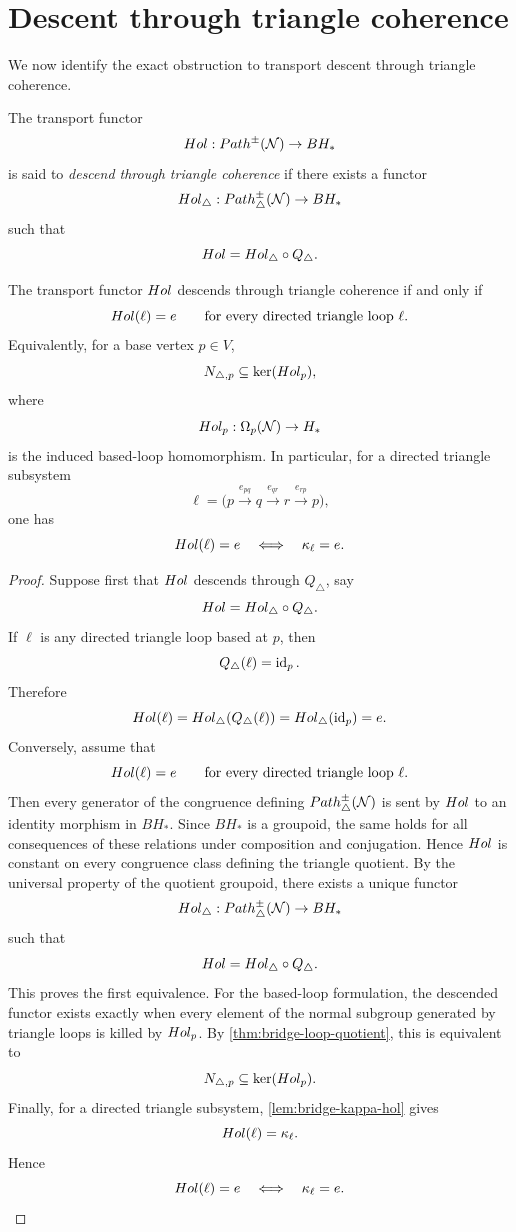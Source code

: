 \section{Descent through triangle coherence}
We now identify the exact obstruction to transport descent through
triangle coherence.
\begin{definition}
	The transport functor
	\[
		Hol:Path^\pm(\mathcal N)\to BH_*
	\]
	is said to \emph{descend through triangle coherence} if there exists a
	functor
	\[
		Hol_\triangle:Path^\pm_\triangle(\mathcal N)\to BH_*
	\]
	such that
	\[
		Hol=Hol_\triangle\circ Q_\triangle.
	\]
\end{definition}
\begin{theorem}
	\label{thm:bridge-descent}
	The transport functor \(Hol\) descends through triangle coherence if
	and only if
	\[
		Hol(\ell)=e
		\qquad
		\text{for every directed triangle loop }\ell.
	\]
	Equivalently, for a base vertex \(p\in V\),
	\[
		N_{\triangle,p}\subseteq \ker(Hol_p),
	\]
	where
	\[
		Hol_p:\Omega_p(\mathcal N)\to H_*
	\]
	is the induced based-loop homomorphism.
	In particular, for a directed triangle subsystem
	\[
		\ell=
		\bigl(
		p\xrightarrow{e_{pq}}q\xrightarrow{e_{qr}}r\xrightarrow{e_{rp}}p
		\bigr),
	\]
	one has
	\[
		Hol(\ell)=e
		\quad\Longleftrightarrow\quad
		\kappa_\ell=e.
	\]
\end{theorem}
\begin{proof}
	Suppose first that \(Hol\) descends through \(Q_\triangle\), say
	\[
		Hol=Hol_\triangle\circ Q_\triangle.
	\]
	If \(\ell\) is any directed triangle loop based at \(p\), then
	\[
		Q_\triangle(\ell)=\operatorname{id}_p.
	\]
	Therefore
	\[
		Hol(\ell)=Hol_\triangle(Q_\triangle(\ell))
		=
		Hol_\triangle(\operatorname{id}_p)
		=
		e.
	\]
	Conversely, assume that
	\[
		Hol(\ell)=e
		\qquad
		\text{for every directed triangle loop }\ell.
	\]
	Then every generator of the congruence defining
	\(Path^\pm_\triangle(\mathcal N)\) is sent by \(Hol\) to an identity
	morphism in \(BH_*\). Since \(BH_*\) is a groupoid, the same holds for all
	consequences of these relations under composition and conjugation.
	Hence \(Hol\) is constant on every congruence class defining the
	triangle quotient. By the universal property of the quotient groupoid,
	there exists a unique functor
	\[
		Hol_\triangle:Path^\pm_\triangle(\mathcal N)\to BH_*
	\]
	such that
	\[
		Hol=Hol_\triangle\circ Q_\triangle.
	\]
	This proves the first equivalence.
	For the based-loop formulation, the descended functor exists exactly
	when every element of the normal subgroup generated by triangle loops is
	killed by \(Hol_p\). By \cref{thm:bridge-loop-quotient}, this is
	equivalent to
	\[
		N_{\triangle,p}\subseteq \ker(Hol_p).
	\]
	Finally, for a directed triangle subsystem, \cref{lem:bridge-kappa-hol}
	gives
	\[
		Hol(\ell)=\kappa_\ell.
	\]
	Hence
	\[
		Hol(\ell)=e
		\quad\Longleftrightarrow\quad
		\kappa_\ell=e.
	\]
\end{proof}

